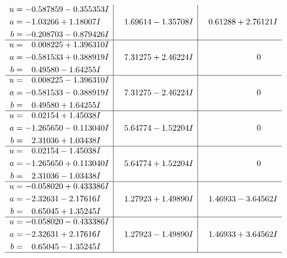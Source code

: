 \documentclass[1p]{elsarticle_modified}
\theoremstyle{definition}
\begin{document}
$$\begin{array}{c|c|c}
\begin{aligned}
u &= -0.587859 - 0.355353 I \\
a &= -1.03266 + 1.18007 I \\
b &= -0.208703 - 0.879426 I\end{aligned}
 & \phantom{-}1.69614 - 1.35708 I & \phantom{-}0.61288 + 2.76121 I \\ \hline\begin{aligned}
u &= \phantom{-}0.008225 + 1.396310 I \\
a &= -0.581533 + 0.388919 I \\
b &= \phantom{-}0.49580 - 1.64255 I\end{aligned}
 & \phantom{-}7.31275 + 2.46224 I & \phantom{-0.000000 } 0 \\ \hline\begin{aligned}
u &= \phantom{-}0.008225 - 1.396310 I \\
a &= -0.581533 - 0.388919 I \\
b &= \phantom{-}0.49580 + 1.64255 I\end{aligned}
 & \phantom{-}7.31275 - 2.46224 I & \phantom{-0.000000 } 0 \\ \hline\begin{aligned}
u &= \phantom{-}0.02154 + 1.45038 I \\
a &= -1.265650 - 0.113040 I \\
b &= \phantom{-}2.31036 + 1.03438 I\end{aligned}
 & \phantom{-}5.64774 - 1.52204 I & \phantom{-0.000000 } 0 \\ \hline\begin{aligned}
u &= \phantom{-}0.02154 - 1.45038 I \\
a &= -1.265650 + 0.113040 I \\
b &= \phantom{-}2.31036 - 1.03438 I\end{aligned}
 & \phantom{-}5.64774 + 1.52204 I & \phantom{-0.000000 } 0 \\ \hline\begin{aligned}
u &= -0.058020 + 0.433386 I \\
a &= -2.32631 - 2.17616 I \\
b &= \phantom{-}0.65045 + 1.35245 I\end{aligned}
 & \phantom{-}1.27923 + 1.49890 I & \phantom{-}1.46933 - 3.64562 I \\ \hline\begin{aligned}
u &= -0.058020 - 0.433386 I \\
a &= -2.32631 + 2.17616 I \\
b &= \phantom{-}0.65045 - 1.35245 I\end{aligned}
 & \phantom{-}1.27923 - 1.49890 I & \phantom{-}1.46933 + 3.64562 I\\
 \hline 
 \end{array}$$\newpage
\end{document}
